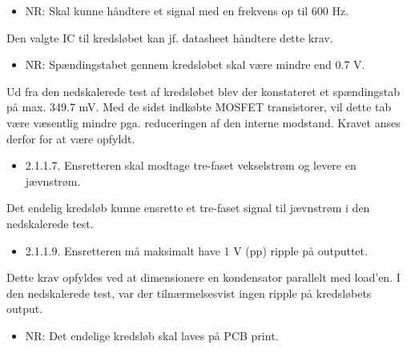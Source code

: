 \begin{itemize}
\item NR: Skal kunne håndtere et signal med en frekvens op til 600 Hz.
\end{itemize}


Den valgte IC til kredsløbet kan jf. datasheet håndtere dette krav. 

\begin{itemize}
\item NR: Spændingstabet gennem kredsløbet skal være mindre end 0.7 V.
\end{itemize}


Ud fra den nedskalerede test af kredsløbet blev der konstateret et spændingstab på max. 349.7 mV. Med de sidst indkøbte MOSFET transistorer, vil dette tab være væsentlig mindre pga. reduceringen af den interne modstand. Kravet anses derfor for at være opfyldt.  

\begin{itemize}
\item 2.1.1.7. Ensretteren skal modtage tre-faset vekselstrøm og levere en jævnstrøm.
\end{itemize}


Det endelig kredsløb kunne ensrette et tre-faset signal til jævnstrøm i den nedskalerede test. 

\begin{itemize}
\item 2.1.1.9. Ensretteren må maksimalt have 1 V (pp) ripple på outputtet.
\end{itemize}


Dette krav opfyldes ved at dimensionere en kondensator parallelt med load’en. I den nedskalerede test, var der tilnærmelsesvist ingen ripple på kredsløbets output.  

\begin{itemize}
\item NR: Det endelige kredsløb skal laves på PCB print.
\end{itemize}





